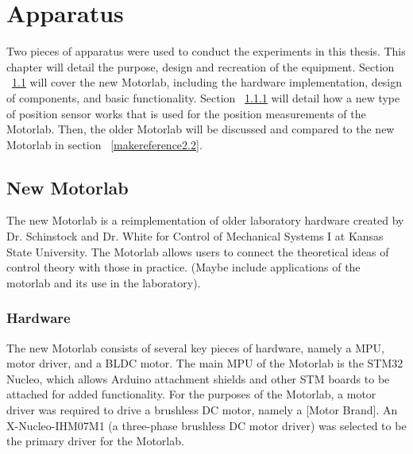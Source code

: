 
\cleardoublepage


\chapter{Apparatus}
\label{makereference2}

Two pieces of apparatus were used to conduct the experiments in this thesis. This chapter will detail the purpose, design and recreation of the equipment. Section ~\ref{makereference2.1} will cover the new Motorlab, including the hardware implementation, design of components, and basic functionality. Section ~\ref{makereference2.1.1} will detail how a new type of position sensor works that is used for the position measurements of the Motorlab. Then, the older Motorlab will be discussed and compared to the new Motorlab in section ~\ref{makereference2.2}.

\section{New Motorlab}
\label{makereference2.1} 

The new Motorlab is a reimplementation of older laboratory hardware created by Dr. Schinstock and Dr. White for Control of Mechanical Systems I at Kansas State University. The Motorlab allows users to connect the theoretical ideas of control theory with those in practice. (Maybe include applications of the motorlab and its use in the laboratory).

\subsection{Hardware}
\label{makereference2.1.1} 

The new Motorlab consists of several key pieces of hardware, namely a \ac{MPU}, motor driver, and a \ac{BLDC} motor. The main MPU of the Motorlab is the STM32 Nucleo, which allows Arduino attachment shields and other STM boards to be attached for added functionality. For the purposes of the Motorlab, a motor driver was required to drive a brushless DC motor, namely a [Motor Brand]. An X-Nucleo-IHM07M1 (a three-phase brushless DC motor driver) was selected to be the primary driver for the Motorlab.

